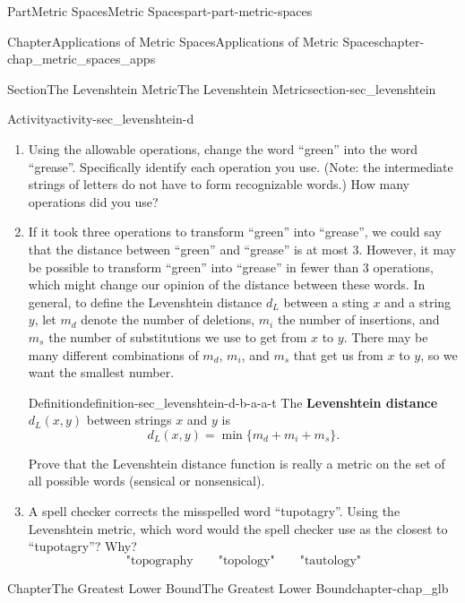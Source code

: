 \documentclass[oneside,10pt,]{book}
\newcommand{\terminology}[1]{\textbf{#1}}
\numberwithin{equation}{chapter}
\begin{document}
\begin{partptx}{Part}{Metric Spaces}{}{Metric Spaces}{}{}{part-part-metric-spaces}
\begin{chapterptx}{Chapter}{Applications of Metric Spaces}{}{Applications of Metric Spaces}{}{}{chapter-chap_metric_spaces_apps}
\begin{sectionptx}{Section}{The Levenshtein Metric}{}{The Levenshtein Metric}{}{}{section-sec_levenshtein}
\begin{activity}{Activity}{}{activity-sec_levenshtein-d}
\begin{enumerate}[font=\bfseries,label=(\alph*),ref=\alph*]%
\item{}Using the allowable operations, change the word ``green'' into the word ``grease''. Specifically identify each operation you use. (Note: the intermediate strings of letters do not have to form recognizable words.) How many operations did you use?%
\item{}If it took three operations to transform ``green'' into ``grease'', we could say that the distance between ``green'' and ``grease'' is at most 3. However, it may be possible to transform ``green'' into ``grease'' in fewer than 3 operations, which might change our opinion of the distance between these words. In general, to define the Levenshtein distance \(d_L\) between a sting \(x\) and a string \(y\), let \(m_d\) denote the number of deletions, \(m_i\) the number of insertions, and \(m_s\) the number of substitutions we use to get from \(x\) to \(y\). There may be many different combinations of \(m_d\), \(m_i\), and \(m_s\) that get us from \(x\) to \(y\), so we want the smallest number. \begin{definition}{Definition}{}{definition-sec_levenshtein-d-b-a-a-t}%
The \terminology{Levenshtein distance} \(d_L(x,y)\) between strings \(x\) and \(y\) is%
\begin{equation*}
d_L(x,y) = \min\{m_d+m_i+m_s\}\text{.}
\end{equation*}
%
\end{definition}
 Prove that the Levenshtein distance function is really a metric on the set of all possible words (sensical or nonsensical).%
\item{}A spell checker corrects the misspelled word ``tupotagry''. Using the Levenshtein metric, which word would the spell checker use as the closest to ``tupotagry''? Why?%
\begin{equation*}
\text{"topography} \qquad \text{"topology"} \qquad \text{"tautology"}
\end{equation*}
%
\end{enumerate}%
\end{activity}%
\end{sectionptx}
\end{chapterptx}
%
\typeout{************************************************}
\typeout{************************************************}
%
\begin{chapterptx}{Chapter}{The Greatest Lower Bound}{}{The Greatest Lower Bound}{}{}{chapter-chap_glb}

\end{chapterptx}
\end{partptx}
\end{document}
